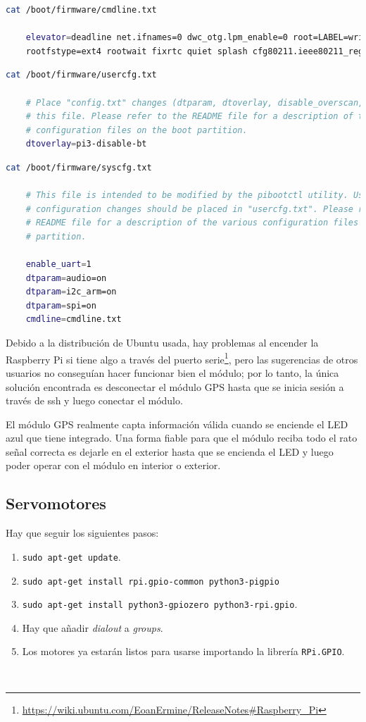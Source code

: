 \begin{lstlisting}[language=bash]
	cat /boot/firmware/cmdline.txt 
	
	elevator=deadline net.ifnames=0 dwc_otg.lpm_enable=0 root=LABEL=writable \
	rootfstype=ext4 rootwait fixrtc quiet splash cfg80211.ieee80211_regdom=GB
\end{lstlisting}

\begin{lstlisting}[language=bash]
	cat /boot/firmware/usercfg.txt 
	
	# Place "config.txt" changes (dtparam, dtoverlay, disable_overscan, etc.) in
	# this file. Please refer to the README file for a description of the various
	# configuration files on the boot partition.
	dtoverlay=pi3-disable-bt
\end{lstlisting}

\begin{lstlisting}[language=bash]
	cat /boot/firmware/syscfg.txt 
	
	# This file is intended to be modified by the pibootctl utility. User
	# configuration changes should be placed in "usercfg.txt". Please refer to the
	# README file for a description of the various configuration files on the boot
	# partition.
	
	enable_uart=1
	dtparam=audio=on
	dtparam=i2c_arm=on
	dtparam=spi=on
	cmdline=cmdline.txt	
\end{lstlisting}


Debido a la distribución de Ubuntu usada, hay problemas al encender la Raspberry Pi si tiene algo a través del puerto serie\footnote{\url{https://wiki.ubuntu.com/EoanErmine/ReleaseNotes\#Raspberry_Pi}}, pero las sugerencias de otros usuarios no conseguían hacer funcionar bien el módulo; por lo tanto, la única solución encontrada es desconectar el módulo \acs{GPS} hasta que se inicia sesión a través de ssh y luego conectar el módulo.

El módulo GPS realmente capta información válida cuando se enciende el LED azul que tiene integrado. Una forma fiable para que el módulo reciba todo el rato señal correcta es dejarle en el exterior hasta que se encienda el LED y luego poder operar con el módulo en interior o exterior. 

\subsection{Servomotores}
\label{subsec:anexomotores}

Hay que seguir los siguientes pasos:

\begin{enumerate}
	\item \verb|sudo apt-get update|.
	\item \verb|sudo apt-get install rpi.gpio-common python3-pigpio|
	\item \verb|sudo apt-get install python3-gpiozero python3-rpi.gpio|.
	\item Hay que añadir \textit{dialout} a \textit{groups}.
	\item Los motores ya estarán listos para usarse importando la librería \verb|RPi.GPIO|.
\end{enumerate}\

